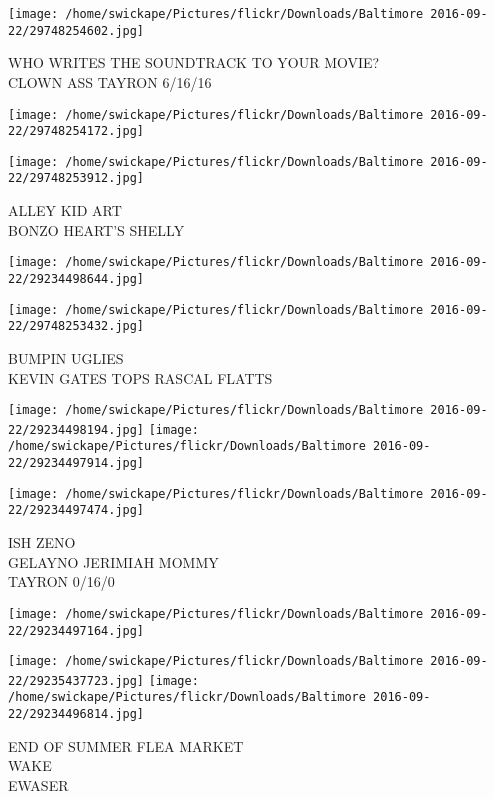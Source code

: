 \documentclass[10pt,letterpaper]{article}
\begin{document}
\vspace{0.25in}
\texttt{[image: /home/swickape/Pictures/flickr/Downloads/Baltimore 2016-09-22/29748254602.jpg]}

WHO WRITES THE SOUNDTRACK TO YOUR MOVIE?\\
CLOWN ASS TAYRON 6/16/16
\pagebreak

\texttt{[image: /home/swickape/Pictures/flickr/Downloads/Baltimore 2016-09-22/29748254172.jpg]}

\vspace{0.25in}
\texttt{[image: /home/swickape/Pictures/flickr/Downloads/Baltimore 2016-09-22/29748253912.jpg]}

ALLEY KID ART\\
BONZO HEART'S SHELLY
\pagebreak

\texttt{[image: /home/swickape/Pictures/flickr/Downloads/Baltimore 2016-09-22/29234498644.jpg]}

\vspace{0.25in}
\texttt{[image: /home/swickape/Pictures/flickr/Downloads/Baltimore 2016-09-22/29748253432.jpg]}

BUMPIN UGLIES\\
KEVIN GATES TOPS RASCAL FLATTS
\pagebreak

\texttt{[image: /home/swickape/Pictures/flickr/Downloads/Baltimore 2016-09-22/29234498194.jpg]}
\texttt{[image: /home/swickape/Pictures/flickr/Downloads/Baltimore 2016-09-22/29234497914.jpg]}

\vspace{0.25in}
\texttt{[image: /home/swickape/Pictures/flickr/Downloads/Baltimore 2016-09-22/29234497474.jpg]}

ISH ZENO\\
GELAYNO JERIMIAH MOMMY\\
TAYRON 0/16/0
\pagebreak

\texttt{[image: /home/swickape/Pictures/flickr/Downloads/Baltimore 2016-09-22/29234497164.jpg]}

\vspace{0.25in}
\texttt{[image: /home/swickape/Pictures/flickr/Downloads/Baltimore 2016-09-22/29235437723.jpg]}
\texttt{[image: /home/swickape/Pictures/flickr/Downloads/Baltimore 2016-09-22/29234496814.jpg]}

END OF SUMMER FLEA MARKET\\
WAKE\\
EWASER
\pagebreak
\end{document}
